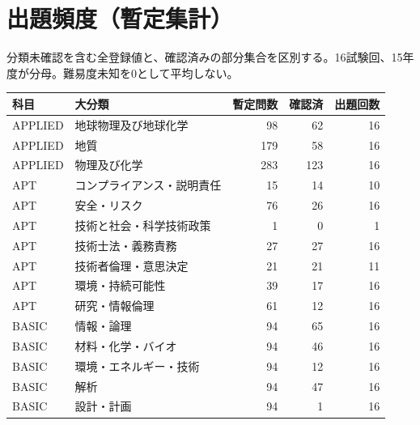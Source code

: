 \chapter{出題頻度（暫定集計）}
分類未確認を含む全登録値と、確認済みの部分集合を区別する。16試験回、15年度が分母。難易度未知を0として平均しない。
\begin{longtable}{p{.16\linewidth}p{.42\linewidth}rrr}
科目 & 大分類 & 暫定問数 & 確認済 & 出題回数\\\hline
APPLIED & 地球物理及び地球化学 & 98 & 62 & 16\\
APPLIED & 地質 & 179 & 58 & 16\\
APPLIED & 物理及び化学 & 283 & 123 & 16\\
APT & コンプライアンス・説明責任 & 15 & 14 & 10\\
APT & 安全・リスク & 76 & 26 & 16\\
APT & 技術と社会・科学技術政策 & 1 & 0 & 1\\
APT & 技術士法・義務責務 & 27 & 27 & 16\\
APT & 技術者倫理・意思決定 & 21 & 21 & 11\\
APT & 環境・持続可能性 & 39 & 17 & 16\\
APT & 研究・情報倫理 & 61 & 12 & 16\\
BASIC & 情報・論理 & 94 & 65 & 16\\
BASIC & 材料・化学・バイオ & 94 & 46 & 16\\
BASIC & 環境・エネルギー・技術 & 94 & 12 & 16\\
BASIC & 解析 & 94 & 47 & 16\\
BASIC & 設計・計画 & 94 & 1 & 16\\
\end{longtable}
